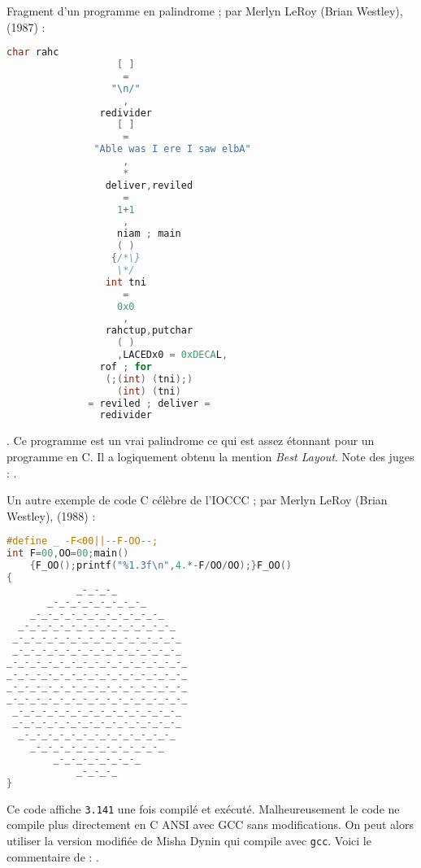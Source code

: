 \documentclass[12pt]{article} %
\begin{document}
\newpage
Fragment d'un programme en palindrome ; par Merlyn LeRoy (Brian Westley), (1987) :
\begin{lstlisting}[language=C, caption={Palindrome}, label={code:palindrome}]
				char rahc
				   [ ]
				    =
				  "\n/"
				    ,
				redivider
				   [ ]
				    =
		       "Able was I ere I saw elbA"
				    ,
				    *
			     deliver,reviled
				    =
				   1+1
				    ,
			       niam ; main
				   ( )
				  {/*\}
				   \*/
				 int tni
				    =
				   0x0
				    ,
			     rahctup,putchar
				   ( )
		           ,LACEDx0 = 0xDECAL,
				rof ; for
			     (;(int) (tni);)
			       (int) (tni)
			  = reviled ; deliver =
				redivider
\end{lstlisting}
 \cite{MEnriqueBermudez-ObfuscatedCCode}. Ce programme est un vrai \gls{palindrome} ce qui est assez étonnant pour un programme en C. Il a logiquement obtenu la mention \textit{Best Layout}. Note des juges : .

\newpage
Un autre exemple de code C célèbre de l'IOCCC ; par Merlyn LeRoy (Brian Westley), (1988) :
\begin{lstlisting}[language=C, caption={Pi circle (westley 1988)}, label={code:pi-circle}]
#define _ -F<00||--F-OO--;
int F=00,OO=00;main()
    {F_OO();printf("%1.3f\n",4.*-F/OO/OO);}F_OO()
{
            _-_-_-_
       _-_-_-_-_-_-_-_-_
    _-_-_-_-_-_-_-_-_-_-_-_
  _-_-_-_-_-_-_-_-_-_-_-_-_-_
 _-_-_-_-_-_-_-_-_-_-_-_-_-_-_
 _-_-_-_-_-_-_-_-_-_-_-_-_-_-_
_-_-_-_-_-_-_-_-_-_-_-_-_-_-_-_
_-_-_-_-_-_-_-_-_-_-_-_-_-_-_-_
_-_-_-_-_-_-_-_-_-_-_-_-_-_-_-_
_-_-_-_-_-_-_-_-_-_-_-_-_-_-_-_
 _-_-_-_-_-_-_-_-_-_-_-_-_-_-_
 _-_-_-_-_-_-_-_-_-_-_-_-_-_-_
  _-_-_-_-_-_-_-_-_-_-_-_-_-_
    _-_-_-_-_-_-_-_-_-_-_-_
        _-_-_-_-_-_-_-_
            _-_-_-_
}
\end{lstlisting}
Ce code affiche \verb|3.141| une fois compilé et exécuté. Malheureusement le code ne compile plus directement en C ANSI avec GCC sans modifications. On peut alors utiliser la version modifiée de Misha Dynin qui compile avec \verb|gcc|. Voici le commentaire de \citeauthor{MEnriqueBermudez-ObfuscatedCCode} :  \cite{MEnriqueBermudez-ObfuscatedCCode}.
\end{document}

